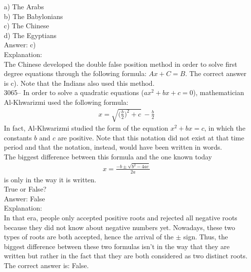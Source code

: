 \documentclass[letterpaper, 12pt]{article}
\begin{document}
a) The Arabs\\
b) The Babylonians\\
c) The Chinese\\
d) The Egyptians\\

Answer: c)\\

Explanation:\\
The Chinese developed the double false position method in order to solve first degree equations through the following formula: $Ax + C = B$. The correct answer is c). Note that the Indians also used this method.\\



3065-- In order to solve a quadratic equations ($ax^{2} + bx + c = 0$), mathematician Al-Khwarizmi used the following formula:
\begin{eqnarray*}
x = \sqrt{\Big(\frac{b}{2}\Big)^{2} + c} \ - \frac{b}{2}
\end{eqnarray*}
In fact, Al-Khwarizmi studied the form of the equation  $x^{2} + bx = c$, in which the constants $b$ and $c$ are positive. Note that this notation did not exist at that time period and that the notation, instead, would have been written in words.\\

The biggest difference between this formula and the one known today
\begin{eqnarray*}
x = \frac{-b \pm \sqrt{b^{2} - 4ac}}{2a}
\end{eqnarray*}
is only in the way it is written.\\
True or False?\\

Answer: False\\

Explanation:\\
In that era, people only accepted positive roots and rejected all negative roots because they did not know about negative numbers yet. Nowadays, these two types of roots are both accepted, hence the arrival of the  $\pm$ sign. Thus, the biggest difference between these two formulas isn't in the way that they are written but rather in the fact that they are both considered as two distinct roots. The correct answer is: False.\\



\end{document}

